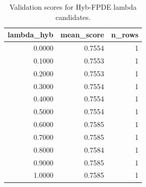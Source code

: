 \begin{table}[t]
\caption{Validation scores for Hyb-FPDE lambda candidates.}
\label{tab:lambda_distribution_computed}
\centering
\begin{tabular}{rrr}
\toprule
lambda\_hyb & mean\_score & n\_rows \\
\midrule
0.0000 & 0.7554 & 1 \\
0.1000 & 0.7553 & 1 \\
0.2000 & 0.7553 & 1 \\
0.3000 & 0.7554 & 1 \\
0.4000 & 0.7554 & 1 \\
0.5000 & 0.7554 & 1 \\
0.6000 & 0.7585 & 1 \\
0.7000 & 0.7585 & 1 \\
0.8000 & 0.7584 & 1 \\
0.9000 & 0.7585 & 1 \\
1.0000 & 0.7585 & 1 \\
\bottomrule
\end{tabular}

\end{table}
